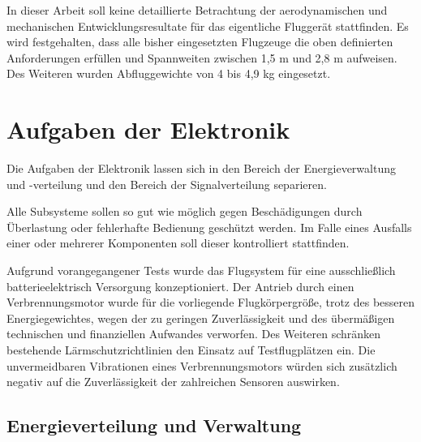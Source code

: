 In dieser Arbeit soll keine detaillierte Betrachtung der aerodynamischen und mechanischen Entwicklungsresultate für das eigentliche Fluggerät stattfinden. Es wird festgehalten, dass alle bisher eingesetzten Flugzeuge die oben definierten Anforderungen erfüllen und Spannweiten zwischen 1,5 m und 2,8 m aufweisen. Des Weiteren wurden Abfluggewichte von 4 bis 4,9 kg eingesetzt.


\section{Aufgaben der Elektronik}

Die Aufgaben der Elektronik lassen sich in den Bereich der Energieverwaltung und -verteilung  und den Bereich der Signalverteilung separieren.

Alle Subsysteme sollen so gut wie möglich gegen Beschädigungen durch Überlastung oder fehlerhafte Bedienung geschützt werden. Im Falle eines Ausfalls einer oder mehrerer Komponenten soll dieser kontrolliert stattfinden.

\begin{comment}??? Wenn möglich soll ein kontrollierter Ausfall der Komponenten in bekannten Zuständen realisiert werden. ???\end{comment}

Aufgrund vorangegangener Tests wurde das Flugsystem für eine ausschließlich batterieelektrisch Versorgung konzeptioniert. Der Antrieb durch einen Verbrennungsmotor wurde für die vorliegende Flugkörpergröße, trotz des besseren Energiegewichtes, wegen der zu geringen Zuverlässigkeit und des übermäßigen technischen und finanziellen Aufwandes verworfen. Des Weiteren schränken bestehende Lärmschutzrichtlinien den Einsatz auf Testflugplätzen ein. Die unvermeidbaren Vibrationen eines Verbrennungsmotors würden sich zusätzlich negativ auf die Zuverlässigkeit der zahlreichen Sensoren auswirken.

\clearpage

\subsection{Energieverteilung und Verwaltung}


